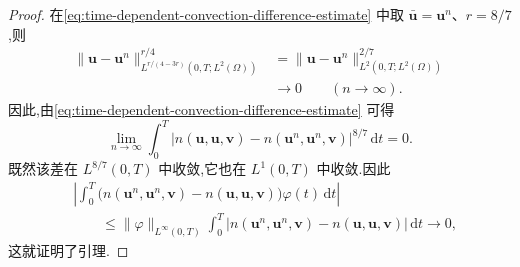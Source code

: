 \begin{lemma}[非线性对流项的收敛]
\begin{proof}
在\cref{eq:time-dependent-convection-difference-estimate} 中取 $\bar{\bm{u}}=\bm{u}^n$、$r=8/7$,则
\[
  \begin{aligned}
  \lVert\bm{u}-\bm{u}^n\rVert_{L^{r/(4-3r)}(0,T;L^2(\Omega))}^{r/4}
    &=\lVert\bm{u}-\bm{u}^n\rVert_{L^2(0,T;L^2(\Omega))}^{2/7}\\
    &\longrightarrow0\qquad(n\to\infty).
  \end{aligned}
\]
因此,由\cref{eq:time-dependent-convection-difference-estimate} 可得
\[
  \lim_{n\to\infty}\int_0^T
    \bigl|n(\bm{u},\bm{u},\bm{v})
        -n(\bm{u}^n,\bm{u}^n,\bm{v})\bigr|^{8/7}
       \,\mathrm{d}t=0.
\]
既然该差在 $L^{8/7}(0,T)$ 中收敛,它也在 $L^1(0,T)$ 中收敛.因此
\[
\begin{aligned}
  &\left|\int_0^T
      \bigl(n(\bm{u}^n,\bm{u}^n,\bm{v})
         -n(\bm{u},\bm{u},\bm{v})\bigr)\varphi(t)\,\mathrm{d}t\right|\\
  &\qquad\leq\lVert\varphi\rVert_{L^\infty(0,T)}
       \int_0^T
        \bigl|n(\bm{u}^n,\bm{u}^n,\bm{v})
          -n(\bm{u},\bm{u},\bm{v})\bigr|\,\mathrm{d}t
       \longrightarrow0,
\end{aligned}
\]
这就证明了引理.
\end{proof}
\end{lemma}

